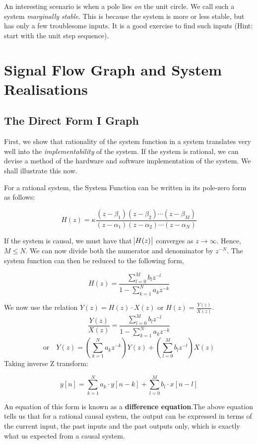 \documentclass{article}
\theoremstyle{definition}
\newcommand\ddfrac[2]{\frac{\displaystyle #1}{\displaystyle #2}}
\begin{document}
An interesting scenario is when a pole lies \textit{on} the unit circle. We call such a system \textit{marginally stable}. This is because the system is more or less stable, but has only a few troublesome inputs. It is a good exercise to find such inputs (Hint: start with the unit step sequence). 
\clearpage 

\section{Signal Flow Graph and System Realisations}
\subsection{The Direct Form I Graph}
First, we show that rationality of the system function in a system translates very well into the \textit{implementability} of the system. If the system is rational, we can devise a method of the hardware and software implementation of the system. We shall illustrate this now. 

For a rational system, the System Function can be written in its pole-zero form as follows:

\[
	H(z) = \kappa \ddfrac{(z-\beta_1)(z-\beta_2) \cdots (z-\beta_M)}{(z-\alpha_1)(z-\alpha_2) \cdots (z-\alpha_N)}
\]

If the system is causal, we must have that $\abs{H(z)}$ converges as $z \rightarrow \infty$. Hence, $M \leq N$. We can now divide both the numerator and denominator by $z^{-N}$. The system function can then be reduced to the following form,

\[
	\boxed{H(z) = \ddfrac{\sum_{l=0}^{M} b_l z^{-l}}{1 - \sum_{k=1}^{N} a_k z^{-k}}}
\]

We now use the relation $Y(z) = H(z) \cdot X(z)$ or $H(z) = \frac{Y(z)}{X(z)}$. 
\[
	\frac{Y(z)}{X(z)} = \ddfrac{\sum_{l=0}^{M} b_l z^{-l}}{1 - \sum_{k=1}^{N} a_k z^{-k}}
\]
\[
	\text{or} \quad Y(z) = \left( \sum_{k=1}^{N} a_k z^{-k} \right) Y(z) + \left( \sum_{l=0}^{M} b_l z^{-l} \right) X(z) 
\]
Taking inverse Z transform:

\[
	\boxed{y[n] = \sum_{k=1}^{N}a_k \cdot y[n-k] + \sum_{l=0}^{M} b_l \cdot x[n-l] }
\]

An equation of this form is known as a \textbf{difference equation}.The above equation tells us that for a rational causal system, the output can be expressed in terms of the current input, the past inputs and the past outputs only, which is exactly what us expected from a causal system. \smallskip
\end{document}

